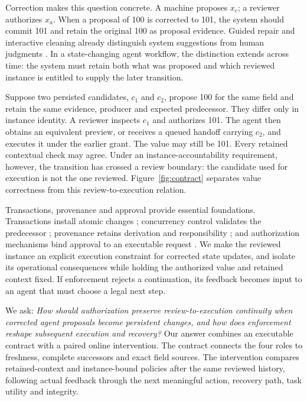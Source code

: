 \documentclass[10pt,a4paper,twocolumn]{article}
\begin{document}
Correction makes this question concrete. A machine proposes $x_c$; a reviewer authorizes $x_a$. When a proposal of 100 is corrected to 101, the system should commit 101 and retain the original 100 as proposal evidence. Guided repair and interactive cleaning already distinguish system suggestions from human judgments \citep{yakout2011guided,he2016falcon}. In a state-changing agent workflow, the distinction extends across time: the system must retain both what was proposed and which reviewed instance is entitled to supply the later transition.

Suppose two persisted candidates, $c_1$ and $c_2$, propose 100 for the same field and retain the same evidence, producer and expected predecessor. They differ only in instance identity. A reviewer inspects $c_1$ and authorizes 101. The agent then obtains an equivalent preview, or receives a queued handoff carrying $c_2$, and executes it under the earlier grant. The value may still be 101. Every retained contextual check may agree. Under an instance-accountability requirement, however, the transition has crossed a review boundary: the candidate used for execution is not the one reviewed. Figure~\ref{fig:contract} separates value correctness from this review-to-execution relation.

Transactions, provenance and approval provide essential foundations. Transactions install atomic changes \citep{gray1981transaction}; concurrency control validates the predecessor \citep{kung1981occ}; provenance retains derivation and responsibility \citep{buneman2006curated,moreau2013provdm}; and authorization mechanisms bind approval to an executable request \citep{clark1987integrity,owaspTransactionAuthorization}. We make the reviewed instance an explicit execution constraint for corrected state updates, and isolate its operational consequences while holding the authorized value and retained context fixed. If enforcement rejects a continuation, its feedback becomes input to an agent that must choose a legal next step.

We ask: \emph{How should authorization preserve review-to-execution continuity when corrected agent proposals become persistent changes, and how does enforcement reshape subsequent execution and recovery?} Our answer combines an executable contract with a paired online intervention. The contract connects the four roles to freshness, complete successors and exact field sources. The intervention compares retained-context and instance-bound policies after the same reviewed history, following actual feedback through the next meaningful action, recovery path, task utility and integrity.
\end{document}
